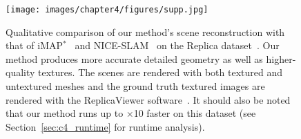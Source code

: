 \begin{figure}[t]
    \begin{center}
        \texttt{[image: images/chapter4/figures/supp.jpg]}
    \end{center}
    \vspace{-1ex}
    \caption{Qualitative comparison of our method's scene reconstruction with that of iMAP$^*$~\citep{sucar2021imap} and NICE-SLAM~\citep{zhu2022nice} on the Replica dataset~\citep{replica19arxiv}. Our method produces more accurate detailed geometry as well as higher-quality textures. The scenes are rendered with both textured and untextured meshes and the ground truth textured images are rendered with the ReplicaViewer software~\citep{replica19arxiv}. It should also be noted that our method runs up to $\times$10 faster on this dataset (see Section~\ref{sec:c4_runtime} for runtime analysis).}
    \label{fig:c4_supp}
\end{figure}

